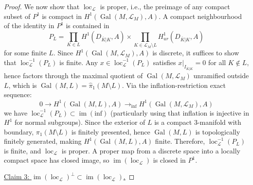 \documentclass{amsart}
\theoremstyle{plain}
\theoremstyle{definition}
\theoremstyle{plain}
\theoremstyle{plain}
\theoremstyle{plain}
\theoremstyle{remark}
\theoremstyle{remark}
\theoremstyle{plain}
\theoremstyle{definition}
\theoremstyle{plain}
\DeclareMathOperator{\Gal}{\mathrm{Gal}}
\DeclareMathOperator{\loc}{\mathrm{loc}}
\DeclareMathOperator{\im}{\mathrm{im}}
\theoremstyle{plain}
\theoremstyle{plain}
\numberwithin{equation}{section}
\begin{document}
\begin{proof}
\medskip

We now show that $\loc_{\mathcal{L}}$ is proper, i.e., the preimage of any compact subset of $P^1$ is compact in $H^1(\Gal(M, \mathcal{L}_M), A)$. A compact neighbourhood of the identity in $P^1$ is contained in 
\begin{equation}
    P_L = \prod_{K \in L}H^1(D_{\overline{K}|K}, A) \times \prod_{K \in \mathcal{L}_M \setminus L}H^1_{ur}(D_{\overline{K}|K}, A)
\end{equation}
for some finite $L$. Since $H^1(\Gal(M, \mathcal{L}_M), A)$ is discrete, it suffices to show that $\loc_{\mathcal{L}}^{-1}(P_L)$ is finite. Any $x \in \loc_{\mathcal{L}}^{-1}(P_L)$ satisfies $x|_{I_{\overline{K}|K}} = 0$ for all $K \notin L$, hence factors through the maximal quotient of $\Gal(M, \mathcal{L}_M)$ unramified outside $L$, which is $\Gal(M, L) = \widehat{\pi}_1(M \setminus L)$. Via the inflation-restriction exact sequence:
\begin{equation}
    0 \to H^1(\Gal(M, L), A) \to_{\text{inf}} H^1(\Gal(M, \mathcal{L}_M), A)
\end{equation}
we have $\loc_{\mathcal{L}}^{-1}(P_L) \subset \im(\text{inf})$ (particularly using that inflation is injective in $H^1$ for normal subgroups). Since the exterior of $L$ is a compact 3-manifold with boundary, $\pi_1(M \setminus L)$ is finitely presented, hence $\Gal(M, L)$ is topologically finitely generated, making $H^1(\Gal(M, L), A)$ finite. Therefore, $\loc_{\mathcal{L}}^{-1}(P_L)$ is finite, and $\loc_{\mathcal{L}}$ is proper. A proper map from a discrete space into a locally compact space has closed image, so $\im(\loc_{\mathcal{L}})$ is closed in $P^1$. 

\medskip

\underline{Claim 3: $\im(\loc_{\mathcal{L}})^\perp \subset \im(\loc_{\mathcal{L}})$.}

\medskip


\end{proof}
\end{document}
